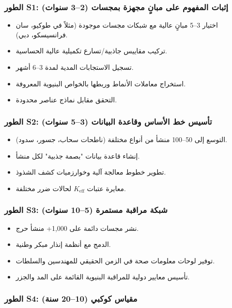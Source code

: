 \documentclass[12pt,a4paper]{article}
\theoremstyle{remark}
\begin{document}
	\subsubsection{الطور S1: إثبات المفهوم على مبانٍ مجهزة بمجسات (2–3 سنوات)}
	
	\begin{itemize}
		\item اختيار 3–5 مبانٍ عالية مع شبكات مجسات موجودة (مثلاً في طوكيو، سان فرانسيسكو، دبي).
		\item تركيب مقاييس جاذبية/تسارع تكميلية عالية الحساسية.
		\item تسجيل الاستجابات المدية لمدة 3–6 أشهر.
		\item استخراج معاملات الأنماط وربطها بالخواص البنيوية المعروفة.
		\item التحقق مقابل نماذج عناصر محدودة.
	\end{itemize}
	
	\subsubsection{الطور S2: تأسيس خط الأساس وقاعدة البيانات (3–5 سنوات)}
	
	\begin{itemize}
		\item التوسع إلى 50–100 منشأ من أنواع مختلفة (ناطحات سحاب، جسور، سدود).
		\item إنشاء قاعدة بيانات "بصمة جذبية" لكل منشأ.
		\item تطوير خطوط معالجة آلية وخوارزميات كشف الشذوذ.
		\item معايرة عتبات \(K_{\mathrm{eff}}\) لحالات ضرر مختلفة.
	\end{itemize}
	
	\subsubsection{الطور S3: شبكة مراقبة مستمرة (5–10 سنوات)}
	
	\begin{itemize}
		\item نشر مجسات دائمة على 1,000+ منشأ حرج.
		\item الدمج مع أنظمة إنذار مبكر وطنية.
		\item توفير لوحات معلومات صحة في الزمن الحقيقي للمهندسين والسلطات.
		\item تأسيس معايير دولية للمراقبة البنيوية القائمة على المد والجزر.
	\end{itemize}
	
	\subsubsection{الطور S4: مقياس كوكبي (10–20 سنة)}
	
\end{document}
